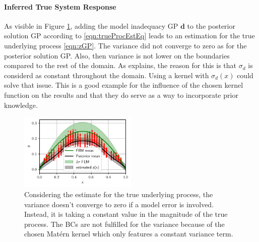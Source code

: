 \documentclass[%
  a4paper,oneside,%
  11pt,%
  smallchapters,
  style=printdev,
  extramargin,
  green,%
  rgb, <cmyk>
  ]{tubsbook}
\begin{document}
\paragraph{Inferred True System Response}
As visible in Figure \ref{fig:Trueproc1D}, adding the model inadequacy GP $\bm{d}$ to the posterior solution GP according to \eqref{eqn:trueProcEstEq} leads to an estimation for the true underlying process \eqref{eqn:zGP}.
The variance did not converge to zero as for the posterior solution GP. Also, then variance is not lower on the boundaries compared to the rest of the domain. As \cite{girolami2021} explains, the reason for this is that $\sigma_d$ is considerd as constant throughout the domain. Using a kernel with $\sigma_d(x)$ could solve that issue. This is a good example for the influence of the chosen kernel function on the results and that they do serve as a way to incorporate prior knowledge.
\begin{figure}[!ht]
\includegraphics[width=0.5\textwidth]{../../Python/Results/1D/Model_Error/100o_30s/ResultZ.pdf}
\centering
\caption[Estimating the true process for the 1D example]{Considering the estimate for the true underlying process, the variance doesn't converge to zero if a model error is involved. Instead, it is taking a constant value in the magnitude of the true process. The BCs are not fulfilled for the variance because of the chosen Mat\'ern kernel which only features a constant variance term.}
\label{fig:Trueproc1D}
\end{figure}




\FloatBarrier
\end{document}
